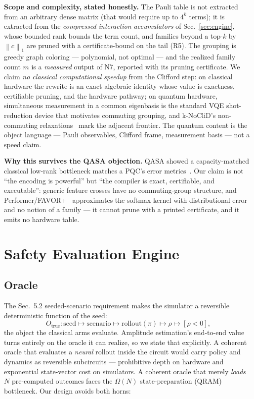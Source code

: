\documentclass[conference,10pt]{IEEEtran}
\newcommand{\norm}[1]{\left\lVert #1 \right\rVert}
\begin{document}
\textbf{Scope and complexity, stated honestly.} The Pauli table is not
extracted from an arbitrary dense matrix (that would require up to $4^k$
terms); it is extracted from the \emph{compressed interaction accumulators} of
Sec.~\ref{sec:engine}, whose bounded rank bounds the term count, and families
beyond a top-$k$ by $\norm{c}_1$ are pruned with a certificate-bound on the
tail (R5). The grouping is greedy graph coloring --- polynomial, not optimal
--- and the realized family count $m$ is a \emph{measured} output of N7,
reported with its pruning certificate. We claim \emph{no classical
computational speedup} from the Clifford step: on classical hardware the
rewrite is an exact algebraic identity whose value is exactness, certifiable
pruning, and the hardware pathway; on quantum hardware, simultaneous
measurement in a common eigenbasis is the standard VQE shot-reduction device
that motivates commuting grouping, and k-NoCliD's non-commuting
relaxations~\cite{knoclid} mark the adjacent frontier. The quantum content is
the object language --- Pauli observables, Clifford frame, measurement basis
--- not a speed claim.

\textbf{Why this survives the QASA objection.} QASA showed a capacity-matched
classical low-rank bottleneck matches a PQC's error metrics~\cite{qasa}. Our
claim is not ``the encoding is powerful'' but ``the compiler is exact,
certifiable, and executable'': generic feature crosses have no commuting-group
structure, and Performer/FAVOR+~\cite{performer} approximates the softmax kernel
with distributional error and no notion of a family --- it cannot prune with a
printed certificate, and it emits no hardware table.

\section{Safety Evaluation Engine}
\label{sec:safety}

\subsection{Oracle}
The Sec.~5.2 seeded-scenario requirement makes the simulator a reversible
deterministic function of the seed:
\begin{equation}
O_{\mathrm{true}}: \mathrm{seed} \mapsto \mathrm{scenario} \mapsto
\mathrm{rollout}(\pi) \mapsto \rho \mapsto [\rho < 0],
\end{equation}
the object the classical arms evaluate. Amplitude estimation's end-to-end value
turns entirely on the oracle it can realize, so we state that explicitly. A
coherent oracle that evaluates a \emph{neural} rollout inside the circuit would
carry policy and dynamics as reversible subcircuits --- prohibitive depth on
hardware and exponential state-vector cost on simulators. A coherent oracle
that merely \emph{loads} $N$ pre-computed outcomes faces the $\Omega(N)$
state-preparation (QRAM) bottleneck. Our design avoids both horns:
\end{document}
